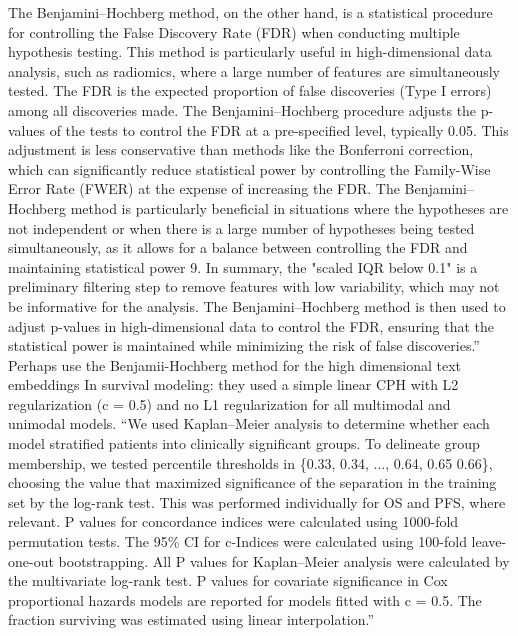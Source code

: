 \documentclass{article}%
\begin{document}
The Benjamini–Hochberg method, on the other hand, is a statistical procedure for controlling the False Discovery Rate (FDR) when conducting multiple hypothesis testing. This method is particularly useful in high{-}dimensional data analysis, such as radiomics, where a large number of features are simultaneously tested. The FDR is the expected proportion of false discoveries (Type I errors) among all discoveries made. The Benjamini–Hochberg procedure adjusts the p{-}values of the tests to control the FDR at a pre{-}specified level, typically 0.05. This adjustment is less conservative than methods like the Bonferroni correction, which can significantly reduce statistical power by controlling the Family{-}Wise Error Rate (FWER) at the expense of increasing the FDR. The Benjamini–Hochberg method is particularly beneficial in situations where the hypotheses are not independent or when there is a large number of hypotheses being tested simultaneously, as it allows for a balance between controlling the FDR and maintaining statistical power 9.%
\newline%
\newline%
%
%
\newline%
\newline%
%
In summary, the "scaled IQR below 0.1" is a preliminary filtering step to remove features with low variability, which may not be informative for the analysis. The Benjamini–Hochberg method is then used to adjust p{-}values in high{-}dimensional data to control the FDR, ensuring that the statistical power is maintained while minimizing the risk of false discoveries.”%
\newline%
\newline%
%
Perhaps use the Benjamii{-}Hochberg method for the high dimensional text embeddings %
\newline%
\newline%
%
In survival modeling: they used a simple linear CPH with L2 regularization (c = 0.5) and no L1 regularization for all multimodal and unimodal models.%
\newline%
\newline%
%
“We used Kaplan–Meier analysis to determine whether each model stratified patients into clinically significant groups. To delineate group membership, we tested percentile thresholds in \{0.33, 0.34, ..., 0.64, 0.65 0.66\}, choosing the value that maximized significance of the separation in the training set by the log{-}rank test. This was performed individually for OS and PFS, where relevant. P values for concordance indices were calculated using 1000{-}fold permutation tests. The 95\% CI for c{-}Indices were calculated using 100{-}fold leave{-}one{-}out bootstrapping. All P values for Kaplan–Meier analysis were calculated by the multivariate log{-}rank test. P values for covariate significance in Cox proportional hazards models are reported for models fitted with c = 0.5. The fraction surviving was estimated using linear interpolation.”%
\end{document}
